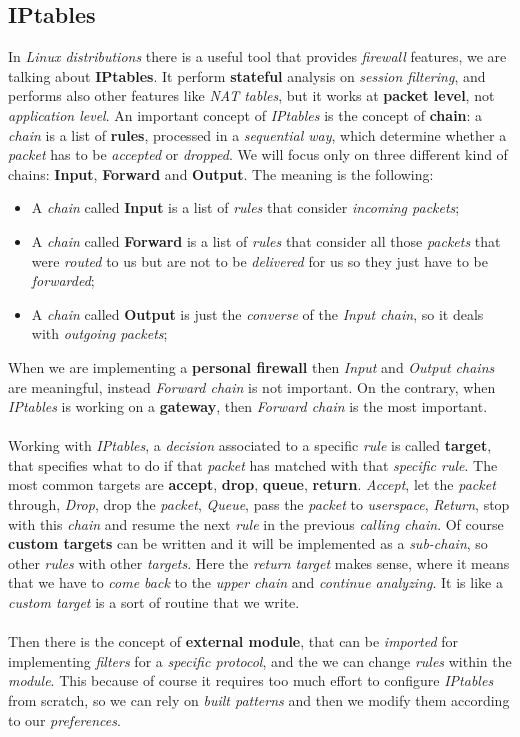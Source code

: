 \documentclass{article}
\begin{document}
\subsection{IPtables}
In \emph{Linux distributions} there is a useful tool that provides \emph{firewall} features, we are talking about \textbf{IPtables}. It perform \textbf{stateful} analysis on \emph{session filtering}, and performs also other features like \emph{NAT tables}, but it works at \textbf{packet level}, not \emph{application level}. An important concept of \emph{IPtables} is the concept of \textbf{chain}: a \emph{chain} is a list of \textbf{rules}, processed in a \emph{sequential way}, which determine whether a \emph{packet} has to be \emph{accepted} or \emph{dropped}. We will focus only on three different kind of chains: \textbf{Input}, \textbf{Forward} and \textbf{Output}. The meaning is the following:
\begin{itemize}
\item A \emph{chain} called \textbf{Input} is a list of \emph{rules} that consider \emph{incoming packets};
\item A \emph{chain} called \textbf{Forward} is a list of \emph{rules} that consider all those \emph{packets} that were \emph{routed} to us but are not to be \emph{delivered} for us so they just have to be \emph{forwarded};
\item A \emph{chain} called \textbf{Output} is just the \emph{converse} of the \emph{Input chain}, so it deals with \emph{outgoing packets};
\end{itemize}
When we are implementing a \textbf{personal firewall} then \emph{Input} and \emph{Output chains} are meaningful, instead \emph{Forward chain} is not important. On the contrary, when \emph{IPtables} is working on a \textbf{gateway}, then \emph{Forward chain} is the most important.  \\\\
Working with \emph{IPtables}, a \emph{decision} associated to a specific \emph{rule} is called \textbf{target}, that specifies what to do if that \emph{packet} has matched with that \emph{specific rule}. The most common targets are \textbf{accept}, \textbf{drop}, \textbf{queue}, \textbf{return}. \emph{Accept}, let the \emph{packet} through, \emph{Drop}, drop the \emph{packet}, \emph{Queue}, pass the \emph{packet} to \emph{userspace}, \emph{Return}, stop with this \emph{chain} and resume the next \emph{rule} in the previous \emph{calling chain}. Of course \textbf{custom targets} can be written and it will be implemented as a \emph{sub-chain}, so other \emph{rules} with other \emph{targets}. Here the \emph{return target} makes sense, where it means that we have to \emph{come back }to the \emph{upper chain} and \emph{continue analyzing}. It is like a \emph{custom target} is a sort of routine that we write. \\\\
Then there is the concept of \textbf{external module}, that can be \emph{imported} for implementing \emph{filters} for a \emph{specific protocol}, and the we can change \emph{rules} within the \emph{module}. This because of course it requires too much effort to configure \emph{IPtables} from scratch, so we can rely on \emph{built patterns} and then we modify them according to our \emph{preferences}.
\end{document}
